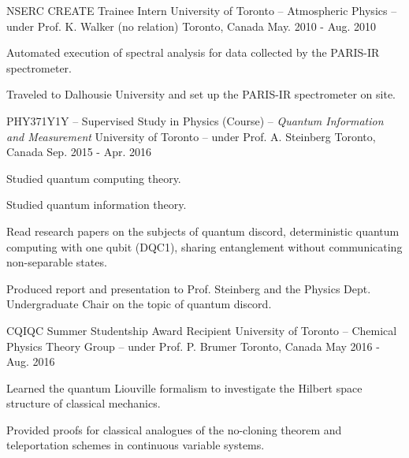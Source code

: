 \begin{cventries}

  \cventry
    {NSERC CREATE Trainee Intern} %
    {University of Toronto -- Atmospheric Physics -- under Prof. K. Walker (no relation)} %
    {Toronto, Canada} %
    {May. 2010 - Aug. 2010} %
    {
      \begin{cvitems} %
        \item{Automated execution of spectral analysis for data collected by the
            PARIS-IR spectrometer.}
        \item{Traveled to Dalhousie University and set up the PARIS-IR
            spectrometer on site.}
      \end{cvitems}
    }

  \cventry
    {PHY371Y1Y -- Supervised Study in Physics (Course) -- \emph{Quantum
        Information and Measurement}} %
    {University of Toronto -- under Prof. A. Steinberg} %
    {Toronto, Canada} %
    {Sep. 2015 - Apr. 2016} %
    {
      \begin{cvitems} %
      \item{Studied quantum computing theory.}
      \item{Studied quantum information theory.}
      \item{Read research papers on the subjects of quantum discord,
          deterministic quantum computing with one qubit (DQC1), sharing
          entanglement without communicating non-separable states.}
      \item{Produced report and presentation to Prof. Steinberg and the Physics
          Dept. Undergraduate Chair on the topic of quantum discord.}
      \end{cvitems}
    }

  \cventry
    {CQIQC Summer Studentship Award Recipient} %
    {University of Toronto -- Chemical Physics Theory Group -- under Prof. P. Brumer} %
    {Toronto, Canada} %
    {May 2016 - Aug. 2016} %
    {
      \begin{cvitems} %
        \item{Learned the quantum Liouville formalism to investigate the Hilbert
            space structure of classical mechanics.}
        \item{Provided proofs for classical analogues of the no-cloning theorem
            and teleportation schemes in continuous variable systems.}
      \end{cvitems}
    }


\end{cventries}
